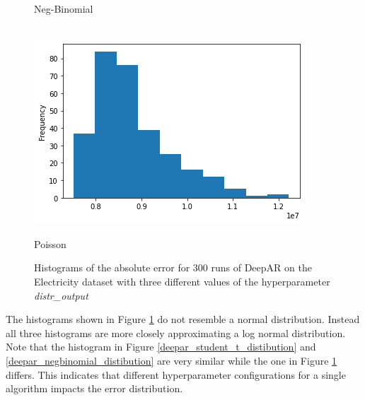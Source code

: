 \begin{figure}[htb]
  \caption{Neg-Binomial}
  \label{deepar_negbinomial_distibution}
  \endminipage\hfill
  \\
  \includegraphics[width=\linewidth]{./img/histogram_deepar_poisson_electricity_statistics_200_samples.png}
  \caption{Poisson}
  \label{deepar_poisson_distribution}
  \endminipage
  \caption{Histograms of the absolute error for 300 runs of DeepAR on the Electricity dataset with three different values of the hyperparameter \emph{distr\_output}}
  \label{deepar_elec_300_hist}
\end{figure}


The histograms shown in Figure \ref{deepar_elec_300_hist} do not resemble a normal distribution. Instead all three histograms are more closely approximating a log normal distribution. Note that the histogram in Figure \ref{deepar_student_t_distibution} and \ref{deepar_negbinomial_distibution} are very similar while the one in Figure \ref{deepar_elec_300_hist} differs. This indicates that different hyperparameter configurations for a single algorithm impacts the error distribution.


